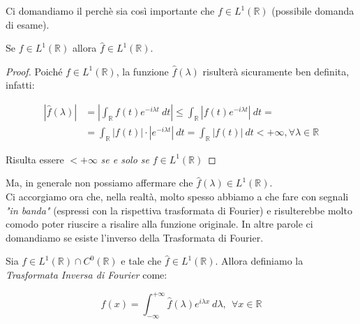 \vspace{1cm}

Ci domandiamo il perchè sia così importante che $f \in L^1(\mathbb{R})$
(possibile domanda di esame).\\

\begin{center}
    Se $f \in L^1(\mathbb{R})$ allora $\hat{f} \in L^1(\mathbb{R})$.
\end{center}

\begin{proof}
    Poiché $f \in L^1(\mathbb{R})$, la funzione $\hat{f}(\lambda)$ risulterà
    sicuramente ben definita, infatti:

    \begin{equation}
        \begin{aligned}
            |\hat{f}(\lambda)| & = \left|\int_{\mathbb{R}} f(t) e^{-i \lambda t} \ dt \right| \leq \int_{\mathbb{R}} |f(t) e^{-i \lambda t}| \ dt =                  \\
                               & = \int_{\mathbb{R}} |f(t)| \cdot |e^{-i \lambda t}| \ dt = \int_{\mathbb{R}} |f(t)| \ dt < + \infty, \forall \lambda \in \mathbb{R}
        \end{aligned}
    \end{equation}

    Risulta essere $< +\infty$ \textit{se e solo se} $f\in L^1(\mathbb{R})$

\end{proof}

Ma, in generale non possiamo affermare che $\hat{f}(\lambda)
    \in L^1(\mathbb{R})$.\\


Ci accorgiamo ora che, nella realtà, molto spesso abbiamo a che fare con segnali
\textit{"in banda"} (espressi con la rispettiva trasformata di Fourier) e
risulterebbe molto comodo poter riuscire a risalire alla funzione originale. In
altre parole ci domandiamo se esiste l'inverso della Trasformata di Fourier.

\begin{theorem}
    Sia $f \in L^1(\mathbb{R}) \cap C^0(\mathbb{R})$ e tale che $\hat{f} \in
        L^1(\mathbb{R})$. Allora definiamo la \textit{Trasformata Inversa di
        Fourier} come:

    $$
        f(x) = \int_{-\infty}^{+\infty} \hat{f}(\lambda) e^{i \lambda x} \
        d\lambda, \ \ \forall x \in \mathbb{R}
    $$
\end{theorem}

